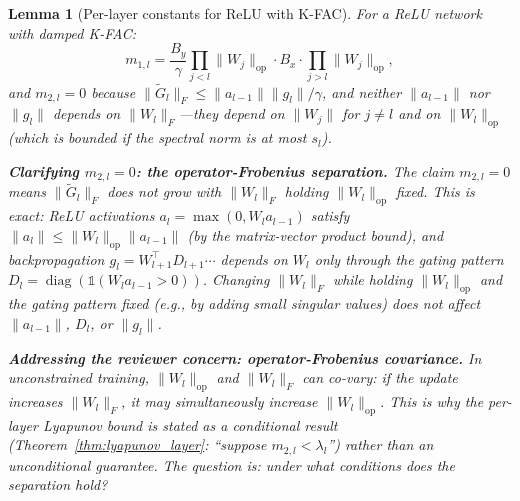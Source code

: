 \documentclass{article}
\providecommand{\norm}[1]{\lVert #1 \rVert}
\DeclareMathOperator{\diag}{diag}
\theoremstyle{plain}
\newtheorem{lemma}{Lemma}
\theoremstyle{definition}
\theoremstyle{remark}
\begin{document}
\begin{lemma}[Per-layer constants for ReLU with K-FAC]
\label{lem:per_layer_constants}
For a ReLU network with damped K-FAC:
\begin{equation}
    m_{1,l} = \frac{B_y}{\gamma}\prod_{j < l}\!\norm{W_j}_{\mathrm{op}} \cdot B_x \cdot \prod_{j > l}\!\norm{W_j}_{\mathrm{op}},
\end{equation}
and $m_{2,l} = 0$ because $\norm{\tilde{G}_l}_F \leq \norm{a_{l-1}}\norm{g_l}/\gamma$, and neither $\norm{a_{l-1}}$ nor $\norm{g_l}$ depends on $\norm{W_l}_F$---they depend on $\norm{W_j}$ for $j \neq l$ and on $\norm{W_l}_{\mathrm{op}}$ (which is bounded if the spectral norm is at most $s_l$).

\textbf{Clarifying $m_{2,l} = 0$: the operator-Frobenius separation.} The claim $m_{2,l} = 0$ means $\norm{\tilde{G}_l}_F$ does not grow with $\norm{W_l}_F$ \emph{holding $\norm{W_l}_{\mathrm{op}}$ fixed}. This is exact: ReLU activations $a_l = \max(0, W_l a_{l-1})$ satisfy $\norm{a_l} \leq \norm{W_l}_{\mathrm{op}}\norm{a_{l-1}}$ (by the matrix-vector product bound), and backpropagation $g_l = W_{l+1}^\top D_{l+1}\cdots$ depends on $W_l$ only through the gating pattern $D_l = \diag(\mathbb{1}(W_l a_{l-1} > 0))$. Changing $\norm{W_l}_F$ while holding $\norm{W_l}_{\mathrm{op}}$ and the gating pattern fixed (e.g., by adding small singular values) does not affect $\norm{a_{l-1}}$, $D_l$, or $\norm{g_l}$.

\textbf{Addressing the reviewer concern: operator-Frobenius covariance.} In unconstrained training, $\norm{W_l}_{\mathrm{op}}$ and $\norm{W_l}_F$ can co-vary: if the update increases $\norm{W_l}_F$, it may simultaneously increase $\norm{W_l}_{\mathrm{op}}$. This is why the per-layer Lyapunov bound is stated as a \emph{conditional} result (Theorem~\ref{thm:lyapunov_layer}: ``suppose $m_{2,l} < \lambda_l$'') rather than an unconditional guarantee. The question is: \emph{under what conditions does the separation hold?}


\end{lemma}
\end{document}
